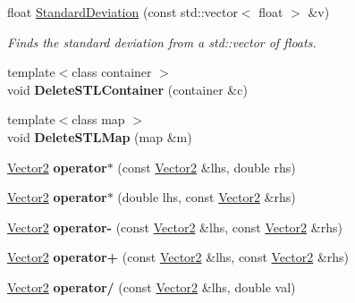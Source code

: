 \begin{DoxyCompactItemize}
\item 
float \hyperlink{namespacesteer_a711dccf7b09d3ec93fb355fd267a7483}{Standard\-Deviation} (const std\-::vector$<$ float $>$ \&v)
\begin{DoxyCompactList}\small\item\em Finds the standard deviation from a std\-::vector of floats. \end{DoxyCompactList}\item 
\hypertarget{namespacesteer_a992945ff2a0d4a6f9ef9270db90c981a}{{\footnotesize template$<$class container $>$ }\\void {\bfseries Delete\-S\-T\-L\-Container} (container \&c)}\label{namespacesteer_a992945ff2a0d4a6f9ef9270db90c981a}

\item 
\hypertarget{namespacesteer_aad536cd984874925d404a37237fa8559}{{\footnotesize template$<$class map $>$ }\\void {\bfseries Delete\-S\-T\-L\-Map} (map \&m)}\label{namespacesteer_aad536cd984874925d404a37237fa8559}

\item 
\hypertarget{namespacesteer_a2bd35e7e51d88896e49245ded868c538}{\hyperlink{structsteer_1_1_vector2}{Vector2} {\bfseries operator$\ast$} (const \hyperlink{structsteer_1_1_vector2}{Vector2} \&lhs, double rhs)}\label{namespacesteer_a2bd35e7e51d88896e49245ded868c538}

\item 
\hypertarget{namespacesteer_a5864f0d19d94daa684b8a55637c84dc2}{\hyperlink{structsteer_1_1_vector2}{Vector2} {\bfseries operator$\ast$} (double lhs, const \hyperlink{structsteer_1_1_vector2}{Vector2} \&rhs)}\label{namespacesteer_a5864f0d19d94daa684b8a55637c84dc2}

\item 
\hypertarget{namespacesteer_afab24ae7b002ad5695b879043aad312b}{\hyperlink{structsteer_1_1_vector2}{Vector2} {\bfseries operator-\/} (const \hyperlink{structsteer_1_1_vector2}{Vector2} \&lhs, const \hyperlink{structsteer_1_1_vector2}{Vector2} \&rhs)}\label{namespacesteer_afab24ae7b002ad5695b879043aad312b}

\item 
\hypertarget{namespacesteer_a73ee549bf316a5ec19e91f68d2fa15ae}{\hyperlink{structsteer_1_1_vector2}{Vector2} {\bfseries operator+} (const \hyperlink{structsteer_1_1_vector2}{Vector2} \&lhs, const \hyperlink{structsteer_1_1_vector2}{Vector2} \&rhs)}\label{namespacesteer_a73ee549bf316a5ec19e91f68d2fa15ae}

\item 
\hypertarget{namespacesteer_a1dafca5ac00c59c23bf462fa43d53687}{\hyperlink{structsteer_1_1_vector2}{Vector2} {\bfseries operator/} (const \hyperlink{structsteer_1_1_vector2}{Vector2} \&lhs, double val)}\label{namespacesteer_a1dafca5ac00c59c23bf462fa43d53687}


\end{DoxyCompactItemize}
